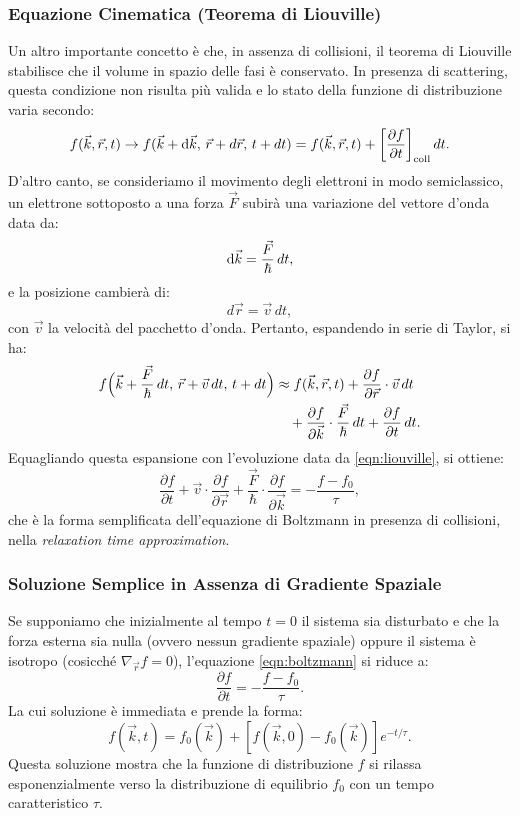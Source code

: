 \subsubsection*{Equazione Cinematica (Teorema di Liouville)}
Un altro importante concetto è che, in assenza di collisioni, il teorema di Liouville stabilisce che il volume in spazio delle fasi è conservato. In presenza di scattering, questa condizione non risulta più valida e lo stato della funzione di distribuzione varia secondo:
\begin{equation}\label{eqn:liouville}
f(\vec{k},\vec{r}, t) \to f(\vec{k}+\text{d}\vec{k},\, \vec{r}+d\vec{r},\, t+dt) = f(\vec{k},\vec{r},t) + \left[\frac{\partial f}{\partial t}\right]_{\text{coll}} dt.
\end{equation}
D'altro canto, se consideriamo il movimento degli elettroni in modo semiclassico, un elettrone sottoposto a una forza \(\vec{F}\) subirà una variazione del vettore d'onda data da:
\[
\text{d}\vec{k} = \frac{\vec{F}}{\hbar}\, dt,
\]
e la posizione cambierà di:
\[
d\vec{r} = \vec{v}\, dt,
\]
con \(\vec{v}\) la velocità del pacchetto d'onda. Pertanto, espandendo in serie di Taylor, si ha:
\begin{equation}
\begin{split}
f\Bigl(\vec{k}+\frac{\vec{F}}{\hbar}\,dt,\, \vec{r}+\vec{v}\,dt,\, t+dt\Bigr) &\approx f(\vec{k},\vec{r},t) + \frac{\partial f}{\partial \vec{r}}\cdot \vec{v}\,dt \\
&\quad + \frac{\partial f}{\partial \vec{k}}\cdot \frac{\vec{F}}{\hbar}\, dt + \frac{\partial f}{\partial t}\, dt.
\end{split}
\end{equation}
Equagliando questa espansione con l'evoluzione data da \eqref{eqn:liouville}, si ottiene:
\begin{equation}\label{eqn:boltzmann}
\frac{\partial f}{\partial t} + \vec{v}\cdot \frac{\partial f}{\partial{\vec{r}}}  + \frac{\vec{F}}{\hbar}\cdot  \frac{\partial f}{\partial{\vec{k}}} = -\frac{f - f_0}{\tau},
\end{equation}
che è la forma semplificata dell'equazione di Boltzmann in presenza di collisioni, nella \emph{relaxation time approximation}.

\subsubsection*{Soluzione Semplice in Assenza di Gradiente Spaziale}

Se supponiamo che inizialmente al tempo \(t=0\) il sistema sia disturbato e che la forza esterna sia nulla (ovvero nessun gradiente spaziale) oppure il sistema è isotropo (cosicché \(\nabla_{\vec{r}} f = 0\)), l'equazione \eqref{eqn:boltzmann} si riduce a:
\[
\frac{\partial f}{\partial t} = -\frac{f-f_0}{\tau}.
\]
La cui soluzione è immediata e prende la forma:
\[
f(\vec{k},t) = f_0(\vec{k}) + \left[f(\vec{k},0)-f_0(\vec{k})\right] e^{-t/\tau}.
\]
Questa soluzione mostra che la funzione di distribuzione \(f\) si rilassa esponenzialmente verso la distribuzione di equilibrio \(f_0\) con un tempo caratteristico \(\tau\).

